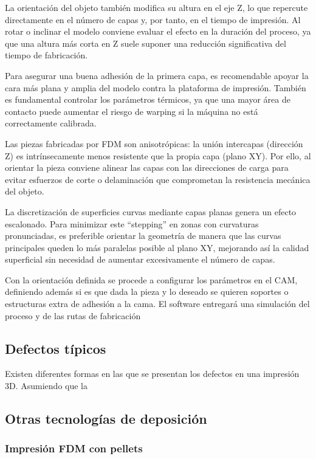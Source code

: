 La orientación del objeto también modifica su altura en el eje Z, lo que repercute directamente en el número de capas y, por tanto, en el tiempo de impresión. Al rotar o inclinar el modelo conviene evaluar el efecto en la duración del proceso, ya que una altura más corta en Z suele suponer una reducción significativa del tiempo de fabricación.

Para asegurar una buena adhesión de la primera capa, es recomendable apoyar la cara más plana y amplia del modelo contra la plataforma de impresión. También es fundamental controlar los parámetros térmicos, ya que una mayor área de contacto puede aumentar el riesgo de warping si la máquina no está correctamente calibrada.

Las piezas fabricadas por FDM son anisotrópicas: la unión intercapas (dirección Z) es intrínsecamente menos resistente que la propia capa (plano XY). Por ello, al orientar la pieza conviene alinear las capas con las direcciones de carga para evitar esfuerzos de corte o delaminación que comprometan la resistencia mecánica del objeto.

La discretización de superficies curvas mediante capas planas genera un efecto escalonado. Para minimizar este “stepping” en zonas con curvaturas pronunciadas, es preferible orientar la geometría de manera que las curvas principales queden lo más paralelas posible al plano XY, mejorando así la calidad superficial sin necesidad de aumentar excesivamente el número de capas.

Con la orientación definida se procede a configurar los parámetros en el CAM, definiendo además si es que dada la pieza y lo deseado se quieren soportes o estructuras extra de adhesión a la cama. El software entregará una simulación del proceso y de las rutas de fabricación

\subsection{Defectos típicos}

Existen diferentes formas en las que se presentan los defectos en una impresión 3D. Asumiendo que la

\subsection{Otras tecnologías de deposición}

\subsubsection{Impresión FDM con pellets}

